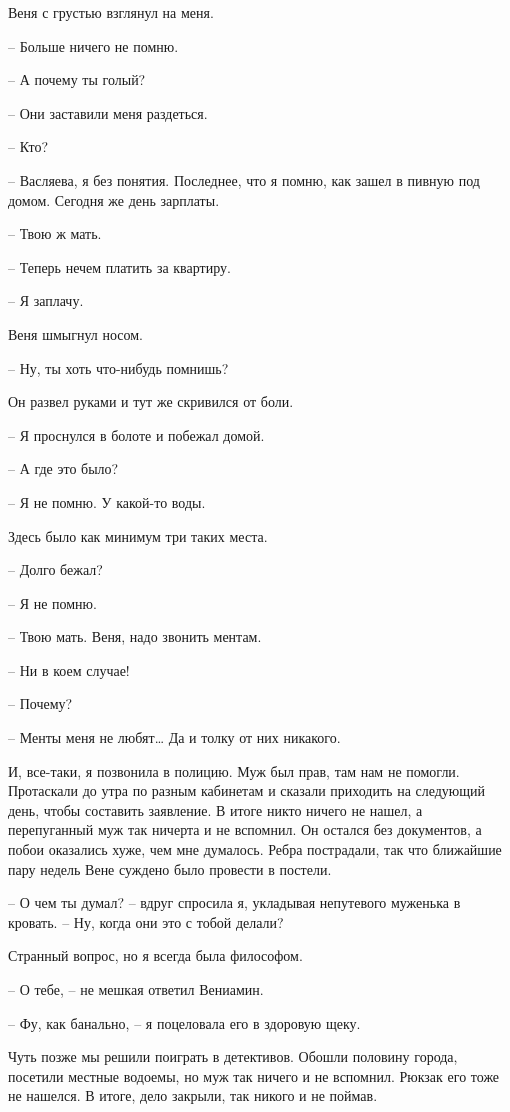 \documentclass[
]{book}
\begin{document}
Веня с грустью взглянул на меня.

-- Больше ничего не помню.

-- А почему ты голый?

-- Они заставили меня раздеться.

-- Кто?

-- Васляева, я без понятия. Последнее, что я помню, как зашел в пивную под домом. Сегодня же день зарплаты.

-- Твою ж мать.

-- Теперь нечем платить за квартиру.

-- Я заплачу.

Веня шмыгнул носом.

-- Ну, ты хоть что-нибудь помнишь?

Он развел руками и тут же скривился от боли.

-- Я проснулся в болоте и побежал домой.

-- А где это было?

-- Я не помню. У какой-то воды.

Здесь было как минимум три таких места.

-- Долго бежал?

-- Я не помню.

-- Твою мать. Веня, надо звонить ментам.

-- Ни в коем случае!

-- Почему?

-- Менты меня не любят\ldots{} Да и толку от них никакого.

И, все-таки, я позвонила в полицию. Муж был прав, там нам не помогли. Протаскали до утра по разным кабинетам и сказали приходить на следующий день, чтобы составить заявление. В итоге никто ничего не нашел, а перепуганный муж так ничерта и не вспомнил. Он остался без документов, а побои оказались хуже, чем мне думалось. Ребра пострадали, так что ближайшие пару недель Вене суждено было провести в постели.

-- О чем ты думал? -- вдруг спросила я, укладывая непутевого муженька в кровать. -- Ну, когда они это с тобой делали?

Странный вопрос, но я всегда была философом.

-- О тебе, -- не мешкая ответил Вениамин.

-- Фу, как банально, -- я поцеловала его в здоровую щеку.

Чуть позже мы решили поиграть в детективов. Обошли половину города, посетили местные водоемы, но муж так ничего и не вспомнил. Рюкзак его тоже не нашелся. В итоге, дело закрыли, так никого и не поймав.
\end{document}
